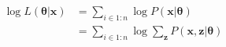 \documentclass[a4paper, 12pt]{article}
\begin{document}
\begin{align}\label{Log-likelihood}
\log L(\boldsymbol{\theta} | \boldsymbol{x}) &= \sum_{i \in 1:n} \log P(\boldsymbol{x} | \boldsymbol{\theta}) \nonumber \\
&= \sum_{i \in 1:n} \log \sum_{\boldsymbol{z}} P(\boldsymbol{x}, \boldsymbol{z} | \boldsymbol{\theta})
\end{align}

\clearpage


\end{document}
